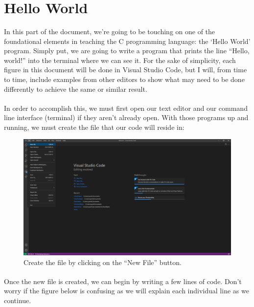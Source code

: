 \section{Hello World}

\paragraph{}
   In this part of the document, we're going to be touching on one of the foundational elements in teaching the C programming language: the `Hello World'
   program. Simply put, we are going to write a program that prints the line ``Hello, world!'' into the terminal where we can see it. For the sake of
   simplicity, each figure in this document will be done in Visual Studio Code, but I will, from time to time, include examples from other editors to
   show what may need to be done differently to achieve the same or similar result.

\paragraph{}
   In order to accomplish this, we must first open our text editor and our command line interface (terminal) if they aren't already open. With those
   programs up and running, we must create the file that our code will reside in:

\begin{figure}[h!]
   \includegraphics[width=\linewidth]{Figure1_VSCODE.png}
   \caption{Create the file by clicking on the ``New File'' button.}
   \label{fig:vscode_newfile}
\end{figure}

\paragraph{}
   Once the new file is created, we can begin by writing a few lines of code. Don't worry if the figure below is confusing as we will explain each
   individual line as we continue.

